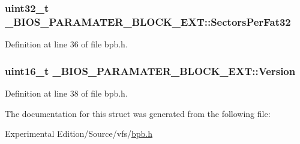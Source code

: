 \subsubsection[{\texorpdfstring{Sectors\+Per\+Fat32}{SectorsPerFat32}}]{\setlength{\rightskip}{0pt plus 5cm}uint32\+\_\+t \+\_\+\+B\+I\+O\+S\+\_\+\+P\+A\+R\+A\+M\+A\+T\+E\+R\+\_\+\+B\+L\+O\+C\+K\+\_\+\+E\+X\+T\+::\+Sectors\+Per\+Fat32}\hypertarget{struct__BIOS__PARAMATER__BLOCK__EXT_acfed1dbed7039b6789e6351ebacee24a}{}\label{struct__BIOS__PARAMATER__BLOCK__EXT_acfed1dbed7039b6789e6351ebacee24a}


Definition at line 36 of file bpb.\+h.

\subsubsection[{\texorpdfstring{Version}{Version}}]{\setlength{\rightskip}{0pt plus 5cm}uint16\+\_\+t \+\_\+\+B\+I\+O\+S\+\_\+\+P\+A\+R\+A\+M\+A\+T\+E\+R\+\_\+\+B\+L\+O\+C\+K\+\_\+\+E\+X\+T\+::\+Version}\hypertarget{struct__BIOS__PARAMATER__BLOCK__EXT_a75c0e772bb6d509159a7ddb90f1567a7}{}\label{struct__BIOS__PARAMATER__BLOCK__EXT_a75c0e772bb6d509159a7ddb90f1567a7}


Definition at line 38 of file bpb.\+h.



The documentation for this struct was generated from the following file\+:\begin{DoxyCompactItemize}
\item 
Experimental Edition/\+Source/vfs/\hyperlink{bpb_8h}{bpb.\+h}\end{DoxyCompactItemize}
